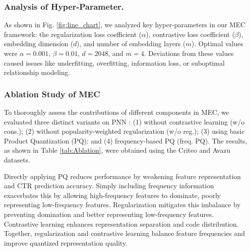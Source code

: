 \subsubsection{Analysis of Hyper-Parameter.}
As shown in Fig. \ref{fig:line_chart}, we analyzed key hyper-parameters in our MEC framework: the regularization loss coefficient ($\alpha$), contrastive loss coefficient ($\beta$), embedding dimension ($d$), and number of embedding layers ($m$). 
Optimal values were $\alpha = 0.001$, $\beta = 0.01$, $d = 2048$, and $m = 4$. Deviations from these values caused issues like underfitting, overfitting, information loss, or suboptimal relationship modeling.


\subsubsection{\textbf{Ablation Study of MEC}}


To thoroughly assess the contributions of different components in MEC, we evaluated three distinct variants on PNN \cite{PNN}: (1) without contrastive learning (w/o cons.); (2) without popularity-weighted regularization (w/o reg.); (3) using basic Product Quantization (PQ); and (4) frequency-based PQ (freq. PQ). The results, as shown in Table \ref{tab:Ablation}, were obtained using the Criteo and Avazu datasets.



Directly applying PQ reduces performance by weakening feature representation and CTR prediction accuracy. Simply including frequency information exacerbates this by allowing high-frequency features to dominate, poorly representing low-frequency features. Regularization mitigates this imbalance by preventing domination and better representing low-frequency features. Contrastive learning enhances representation separation and code distribution. Together, regularization and contrastive learning balance feature frequencies and improve quantized representation quality.


